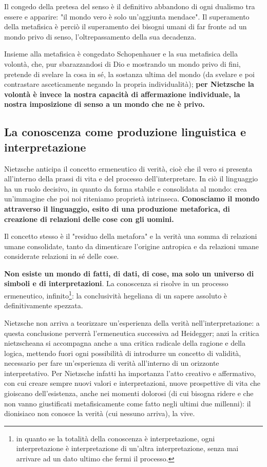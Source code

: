Il congedo della pretesa del senso è il definitivo abbandono di  ogni dualismo tra essere e apparire: "il mondo vero è solo un'aggiunta mendace". Il superamento della metafisica è perciò il superamento dei bisogni umani di far fronte ad un mondo privo di senso, l'oltrepassamento della sua decadenza.

Insieme alla metafisica è congedato Schopenhauer e la sua metafisica della volontà, che, pur sbarazzandosi di Dio e mostrando un mondo privo di fini, pretende di svelare la cosa in sé, la sostanza ultima del mondo (da svelare e poi contrastare asceticamente negando la propria individualità); \textbf{per Nietzsche la volontà è invece la nostra capacità di affermazione individuale, la nostra imposizione di senso a un mondo che ne è privo.}

\subsection{La conoscenza come produzione linguistica e interpretazione}

Nietzsche anticipa il concetto ermeneutico di verità, cioè che il vero si presenta all'interno della prassi di vita e del processo dell'interpretare. In ciò il linguaggio ha un ruolo decisivo, in quanto da forma stabile e consolidata al mondo: crea un'immagine che poi noi riteniamo proprietà intrinseca. \textbf{Conosciamo il mondo attraverso il linguaggio, esito di una produzione metaforica, di creazione di relazioni delle cose con gli uomini.}

Il concetto stesso è il "residuo della metafora" e la verità una somma di relazioni umane consolidate, tanto da dimenticare l'origine antropica e da relazioni umane considerate relazioni in sé delle cose.

\textbf{Non esiste un mondo di fatti, di dati, di cose, ma solo un universo di simboli e di interpretazioni}. La conoscenza si risolve in un processo ermeneutico, infinito\footnote{in quanto se la totalità della conoscenza è interpretazione, ogni interpretazione è interpretazione di un'altra interpretazione, senza mai arrivare ad un dato ultimo che fermi il processo.}: la conclusività hegeliana di un sapere assoluto è definitivamente spezzata.

Nietzsche non arriva a teorizzare un'esperienza della verità nell'interpretazione: a questa conclusione perverrà l'ermeneutica successiva ad Heidegger; anzi la critica nietzscheana si accompagna anche a una critica radicale della ragione e della logica, mettendo fuori ogni possibilità di introdurre un concetto di validità, necessario per fare un'esperienza di verità all'interno di un orizzonte interpretativo. Per Nietzsche infatti ha importanza l'atto creativo e affermativo, con cui creare sempre nuovi valori e interpretazioni, nuove prospettive di vita che gioiscano  dell'esistenza, anche nei momenti dolorosi (di cui bisogna ridere e che non vanno giustificati metafisicamente come fatto negli ultimi due millenni): il dionisiaco non conosce la verità (cui nessuno arriva), la vive.


